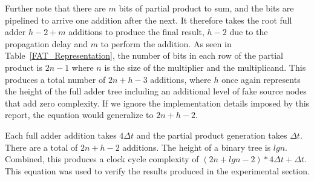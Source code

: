 \documentclass{article}
\begin{document}
Further note that there are $m$ bits of partial product to sum, and the bits are pipelined to arrive one addition after the next. It therefore takes the root full adder $h-2+m$ additions to produce the final result, $h-2$ due to the propagation delay and $m$ to perform the addition. As seen in Table~\ref{FAT_Representation}, the number of bits in each row of the partial product is $2n-1$ where $n$ is the size of the multiplier and the multiplicand. This produces a total number of $2n+h-3$ additions, where $h$ once again represents the height of the full adder tree including an additional level of fake source nodes that add zero complexity. If we ignore the implementation details imposed by this report, the equation would generalize to $2n+h-2$.

Each full adder addition takes $4\Delta t$ and the partial product generation takes $\Delta t$. There are a total of $2n+h-2$ additions. The height of a binary tree is $lgn$. Combined, this produces a clock cycle complexity of $(2n+lgn-2)*4\Delta t + \Delta t$. This equation was used to verify the results produced in the experimental section.
\end{document}
